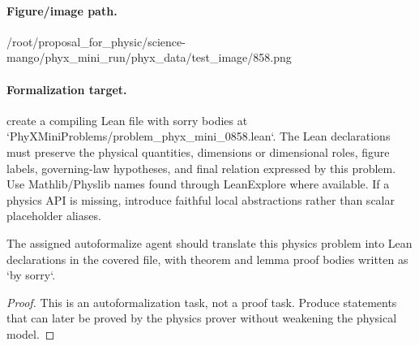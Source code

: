 \paragraph{Figure/image path.}
/root/proposal\_for\_physic/science-mango/phyx\_mini\_run/phyx\_data/test\_image/858.png

\paragraph{Formalization target.}
create a compiling Lean file with sorry bodies at `PhyXMiniProblems/problem\_phyx\_mini\_0858.lean`. The Lean declarations must preserve the physical quantities, dimensions or dimensional roles, figure labels, governing-law hypotheses, and final relation expressed by this problem.
Use Mathlib/Physlib names found through LeanExplore where available. If a physics API is missing, introduce faithful local abstractions rather than scalar placeholder aliases.

\begin{theorem}
\label{thm:physics:phyx_mini_0858:target}
The assigned autoformalize agent should translate this physics problem into Lean declarations in the covered file, with theorem and lemma proof bodies written as `by sorry`.
\end{theorem}
\begin{proof}
This is an autoformalization task, not a proof task. Produce statements that can later be proved by the physics prover without weakening the physical model.
\end{proof}

